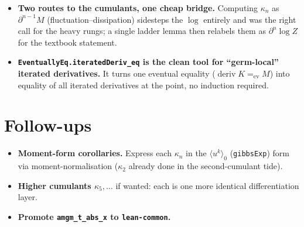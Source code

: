 \documentclass[11pt]{article}
\newcommand{\deriv}{\operatorname{deriv}}
\begin{document}
\begin{itemize}[itemsep=3pt]
\item \textbf{Two routes to the cumulants, one cheap bridge.} Computing
  $\kappa_n$ as $\partial^{n-1} M$ (fluctuation--dissipation) sidesteps the
  $\log$ entirely and was the right call for the heavy rungs; a single ladder
  lemma then relabels them as $\partial^n\log Z$ for the textbook statement.
\item \textbf{\texttt{EventuallyEq.iteratedDeriv\_eq} is the clean tool for
  ``germ-local'' iterated derivatives.} It turns one eventual equality
  ($\deriv K =_{\text{ev}} M$) into equality of all iterated derivatives at the
  point, no induction required.
\end{itemize}

\section{Follow-ups}

\begin{itemize}[itemsep=3pt]
\item \textbf{Moment-form corollaries.} Express each $\kappa_n$ in the
  $\langle u^k\rangle_0$ (\texttt{gibbsExp}) form via moment-normalisation
  ($\kappa_2$ already done in the second-cumulant tide).
\item \textbf{Higher cumulants $\kappa_5,\dots$} if wanted: each is one more
  identical differentiation layer.
\item \textbf{Promote \texttt{amgm\_t\_abs\_x} to \texttt{lean-common}.}
\end{itemize}
\end{document}
